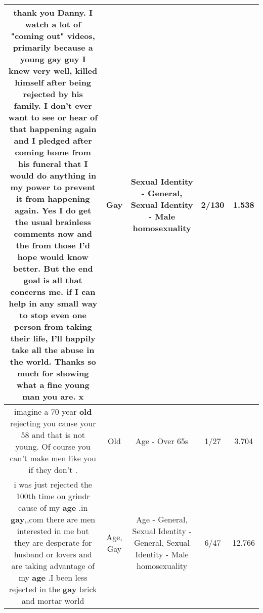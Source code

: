 \documentclass[11pt]{article}
\newlength\mylength
\begin{document}
\begin{center}
\begin{longtable}{|C{.65\mylength}|C{.30\mylength}|C{.12\mylength}|C{.12\mylength}|C{.12\mylength}|}
  \small thank you Danny. I watch a lot of "coming out" videos, primarily because a young \textbf{g\textbf{ay}} guy I knew very well, killed himself after being rejected by his family. I don't ever want to see or hear of that happening again and I pledged after coming home from his funeral that I would do anything in my power to prevent it from happening again. Yes I do get the usual brainless comments now and the from those I'd hope would know better. But the end goal is all that concerns me. if I can help in any small way to stop even one person from taking their life,  I'll happily take all the abuse in the world. Thanks so much for showing what a fine young man you are. x\normalsize   & Gay & Sexual Identity - General, Sexual Identity - Male homosexuality & 2/130 & 1.538 \\  \hline
  \small imagine a 70 year \textbf{old} rejecting  you cause your 58 and that is not  young. Of course   you can't make men like  you if they don't .\normalsize   & Old & Age - Over 65s & 1/27 & 3.704 \\  \hline
  \small i was just rejected the 100th time on grindr  cause of my \textbf{age} .in \textbf{g\textbf{ay}},,com there are men interested in me but they are desperate  for husband or lovers and are taking advantage of my \textbf{age} .I been less rejected in the \textbf{g\textbf{ay}} brick and mortar world\normalsize   & Age, Gay & Age - General, Sexual Identity - General, Sexual Identity - Male homosexuality & 6/47 & 12.766 \\  \hline

\end{longtable}
\end{center}
\end{document}
